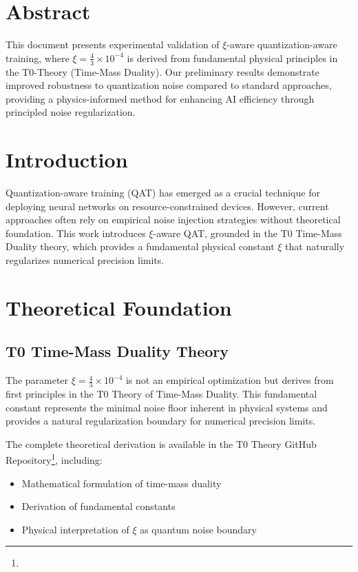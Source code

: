 \section*{Abstract}
		This document presents experimental validation of $\xi$-aware quantization-aware training, where $\xi = \frac{4}{3} \times 10^{-4}$ is derived from fundamental physical principles in the T0-Theory (Time-Mass Duality). Our preliminary results demonstrate improved robustness to quantization noise compared to standard approaches, providing a physics-informed method for enhancing AI efficiency through principled noise regularization.

	
	
	\section{Introduction}
	
	Quantization-aware training (QAT) has emerged as a crucial technique for deploying neural networks on resource-constrained devices. However, current approaches often rely on empirical noise injection strategies without theoretical foundation. This work introduces $\xi$-aware QAT, grounded in the T0 Time-Mass Duality theory, which provides a fundamental physical constant $\xi$ that naturally regularizes numerical precision limits.
	
	\section{Theoretical Foundation}
	
	\subsection{T0 Time-Mass Duality Theory}
	
	The parameter $\xi = \frac{4}{3} \times 10^{-4}$ is not an empirical optimization but derives from first principles in the T0 Theory of Time-Mass Duality. This fundamental constant represents the minimal noise floor inherent in physical systems and provides a natural regularization boundary for numerical precision limits.
	
	The complete theoretical derivation is available in the T0 Theory GitHub Repository\footnote{}, including:
	\begin{itemize}
		\item Mathematical formulation of time-mass duality
		\item Derivation of fundamental constants
		\item Physical interpretation of $\xi$ as quantum noise boundary
	\end{itemize}
	
